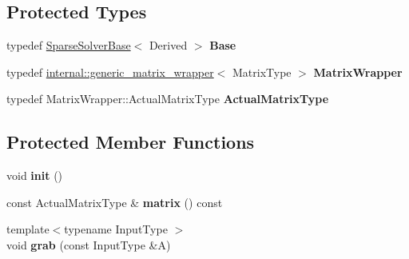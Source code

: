 \subsection*{Protected Types}
\begin{DoxyCompactItemize}
\item 
\mbox{\label{class_eigen_1_1_iterative_solver_base_aa1b0d2236c341b5144a36db443173282}} 
typedef \mbox{\hyperlink{class_eigen_1_1_sparse_solver_base}{Sparse\+Solver\+Base}}$<$ Derived $>$ {\bfseries Base}
\item 
\mbox{\label{class_eigen_1_1_iterative_solver_base_a05704025d4766af7c4a8190d000eb946}} 
typedef \mbox{\hyperlink{class_eigen_1_1internal_1_1generic__matrix__wrapper}{internal\+::generic\+\_\+matrix\+\_\+wrapper}}$<$ Matrix\+Type $>$ {\bfseries Matrix\+Wrapper}
\item 
\mbox{\label{class_eigen_1_1_iterative_solver_base_a483da55fcd8ca464e36f06af7e865bba}} 
typedef Matrix\+Wrapper\+::\+Actual\+Matrix\+Type {\bfseries Actual\+Matrix\+Type}
\end{DoxyCompactItemize}
\subsection*{Protected Member Functions}
\begin{DoxyCompactItemize}
\item 
\mbox{\label{class_eigen_1_1_iterative_solver_base_a838f657cbd7a4e1e33941f386a4b4350}} 
void {\bfseries init} ()
\item 
\mbox{\label{class_eigen_1_1_iterative_solver_base_af201e47006a87f748e1ad464d041e0a1}} 
const Actual\+Matrix\+Type \& {\bfseries matrix} () const
\item 
\mbox{\label{class_eigen_1_1_iterative_solver_base_a5cc46e289554db119b042bd610e6cac0}} 
{\footnotesize template$<$typename Input\+Type $>$ }\\void {\bfseries grab} (const Input\+Type \&A)
\end{DoxyCompactItemize}
